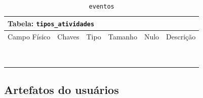 \documentclass[12pt,a4paper]{article}
\begin{document}
\begin{center}
\begin{table}[h!]
	\caption{\texttt{eventos}}
	\label{tabela:eventos}
	\begin{tabular}{|p{2.5cm}|p{1cm}|p{1.25cm}|p{1.75cm}|p{1.25cm}|p{5cm}|}\hline	
		\multicolumn{6}{|p{16cm}|}{\cellcolor{cinzaClaro}  \centering Tabela: \texttt{tipos\_atividades}} \\ \hline %
		{\small Campo Físico}   & {\small Chaves} & {\small Tipo} & {\small Tamanho} & {\small Nulo} & {\small Descrição}\\\hline %
		
		{\tiny } & {\tiny } & {\tiny } & {\tiny } & {\tiny } &{\tiny }\\\hline
		{\tiny } & {\tiny } & {\tiny } & {\tiny } & {\tiny } &{\tiny }\\\hline
		{\tiny } & {\tiny } & {\tiny } & {\tiny } & {\tiny } &{\tiny }\\\hline
		{\tiny } & {\tiny } & {\tiny } & {\tiny } & {\tiny } &{\tiny }\\\hline
		{\tiny } & {\tiny } & {\tiny } & {\tiny } & {\tiny } &{\tiny }\\\hline
		{\tiny } & {\tiny } & {\tiny } & {\tiny } & {\tiny } &{\tiny }\\\hline
		{\tiny } & {\tiny } & {\tiny } & {\tiny } & {\tiny } &{\tiny }\\\hline
		{\tiny } & {\tiny } & {\tiny } & {\tiny } & {\tiny } &{\tiny }\\\hline
		{\tiny } & {\tiny } & {\tiny } & {\tiny } & {\tiny } &{\tiny }\\\hline
		
			
	\end{tabular}
\end{table}	
\end{center}

\subsection{Artefatos do usuários}

\end{document}
